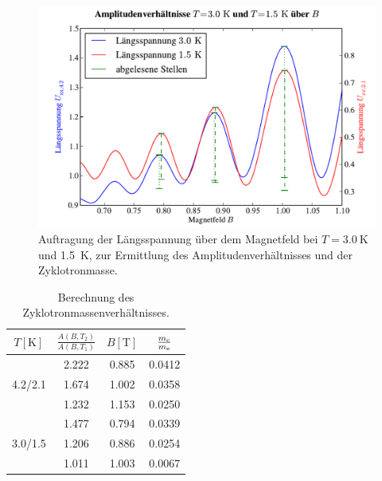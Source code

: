 \documentclass[paper=a4,fontsize=10pt,DIV=18,twocolumn,parskip=half]{scrartcl}
\numberwithin{equation}{section}    %
\newcommand{\kor}[1]{{\color{darkgreen}#1}}
\begin{document}
\begin{figure}[htp]
	\begin{center}
		\includegraphics[width=\columnwidth]{Data-Plots/13-3,0-1,5-zyklotron-B.pdf}
		\caption{Auftragung der Längsspannung über dem Magnetfeld bei $T=\SI{3.0}{\kelvin}$ und \SI{1.5}{\kelvin}, zur Ermittlung des Amplitudenverhältnisses und der Zyklotronmasse.}
		\label{fig:zyklotronmasse2}
	\end{center}
\end{figure}

\begin{table}[htp]
	\begin{center}
		\kor{\begin{tabular}{c|ccc}
			\hline
			$T[\mathrm{K}]$ & $\frac{A(B,T_2)}{A(B,T_1)}$ & $B[\mathrm{T}]$ & $\frac{m_{\rm c}}{m_{\rm e}}$\\
			\hline
			 		& 2.222 & 0.885 & 0.0412 \\
			4.2/2.1 & 1.674 & 1.002 & 0.0358 \\
			 		& 1.232 & 1.153 & 0.0250 \\
			\hline
					& 1.477 & 0.794 & 0.0339 \\
			3.0/1.5 & 1.206 & 0.886 & 0.0254 \\
					& 1.011 & 1.003 & 0.0067 \\
		\end{tabular}}
		\caption{Berechnung des Zyklotronmassenverhältnisses.}
		\label{tab:zyklotronmasse}
	\end{center}
\end{table}
\end{document}
